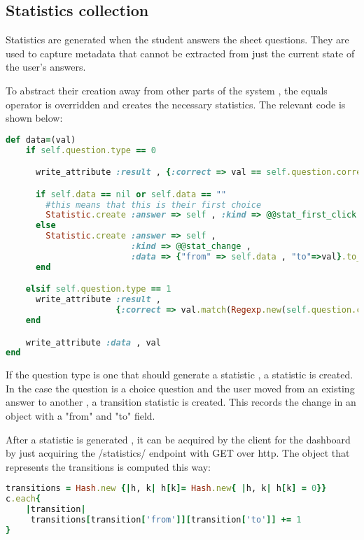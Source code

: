 \subsection{Statistics collection}
Statistics are generated when the student answers the sheet questions. They are used to capture metadata that cannot be extracted from just the current state of the user's answers.

To abstract their creation away from other parts of the system , the equals operator is overridden and creates the necessary statistics. The relevant code is shown below:

\begin{lstlisting}[breaklines,language=Ruby,frame=single,basicstyle=\ttfamily,
    stringstyle=\color{red},
    keywordstyle=\color{blue}]
def data=(val)
    if self.question.type == 0

      write_attribute :result , {:correct => val == self.question.correct_answer}.to_json

      if self.data == nil or self.data == ""
        #this means that this is their first choice
        Statistic.create :answer => self , :kind => @@stat_first_click , :data => val
      else
        Statistic.create :answer => self ,
                         :kind => @@stat_change ,
                         :data => {"from" => self.data , "to"=>val}.to_json.to_s
      end

    elsif self.question.type == 1
      write_attribute :result ,
                      {:correct => val.match(Regexp.new(self.question.correct_answer)) != nil}.to_json
    end

    write_attribute :data , val
end
\end{lstlisting}

If the question type is one that should generate a statistic , a statistic is created. In the case the question is a choice question and the user moved from an existing answer to another , a transition statistic is created. This records the change in an object with a "from" and "to" field.

After a statistic is generated , it can be acquired by the client for the dashboard by just acquiring the /statistics/ endpoint with GET over http. The object that represents the transitions is computed this way:

\begin{lstlisting}[breaklines,language=Ruby,frame=single,basicstyle=\ttfamily,
    stringstyle=\color{red},
    keywordstyle=\color{blue}]
transitions = Hash.new {|h, k| h[k]= Hash.new{ |h, k| h[k] = 0}}
c.each{
    |transition|
	 transitions[transition['from']][transition['to']] += 1
}
\end{lstlisting}

